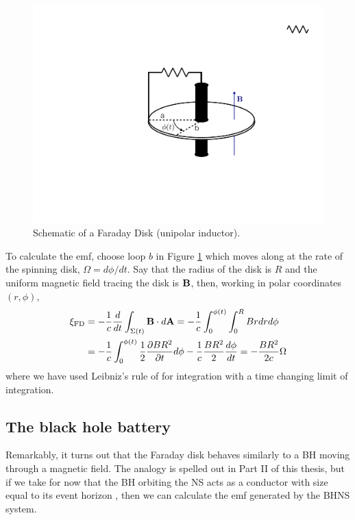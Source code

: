 \begin{figure}
\begin{center}
\includegraphics[scale=0.33]{figures/ch0/UI_schematic} 
\end{center}
\caption{Schematic of a Faraday Disk (unipolar inductor).}
\label{Fig:FDschem}
\end{figure}


To calculate the emf, choose loop $b$ in Figure \ref{Fig:FDschem} which moves
along at the rate of the spinning disk, $\Omega = d\phi/dt$. Say that the
radius of the disk is $R$ and the uniform magnetic field tracing the disk is ${\bf B}$, then, working in polar coordinates $(r, \phi)$,
\begin{align}
\xi_{\rm FD} &= - \frac{1}{c} \frac{d}{dt} \int_{\Sigma(t)}{{\bf B} \cdot d{\bf A}} =  - \frac{1}{c} \int^{\phi(t)}_{0} \int^{R}_{0}{B r dr d\phi}  \\
&= - \frac{1}{c} \int^{\phi(t)}_{0}{\frac{1}{2}\frac{\partial B R^2}{\partial t} d\phi} -  \frac{1}{c} \frac{B R^2}{2} \frac{d\phi}{dt}  = -\frac{B R^2}{2c} \Omega
\end{align}
where we have used Leibniz's rule of for integration with a time changing limit of integration. 

\subsection{The black hole battery} 
Remarkably, it turns out that the Faraday
disk behaves similarly to a BH moving through a magnetic field. The analogy is
spelled out in Part II of this thesis, but if we take for now that the BH
orbiting the NS acts as a conductor with size equal to its event horizon
\citep{MPBook}, then we can calculate the emf generated by the BHNS system.

